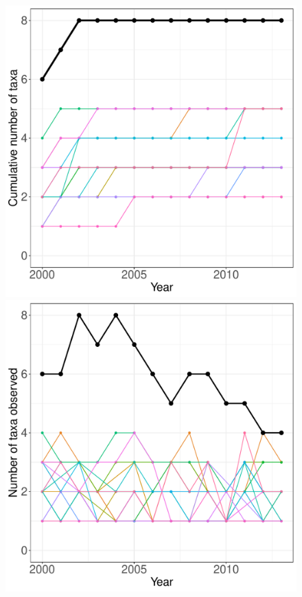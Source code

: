 \documentclass[11pt, oneside]{article}
\begin{document}
\begin{figure}[h!]
\centering
\includegraphics[scale = 0.4]{gce-mollusc-compagnoni_species_accumulation_curve.pdf}
\includegraphics[scale = 0.4]{gce-mollusc-compagnoni_num_taxa_over_time.pdf}

\end{figure}
\end{document}
